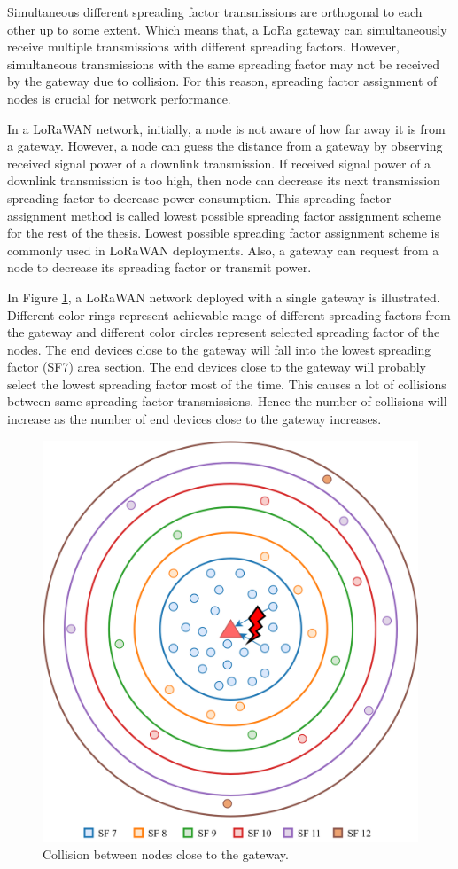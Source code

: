 Simultaneous different spreading factor transmissions are orthogonal to each other up to some extent. Which means that, a LoRa gateway can simultaneously receive multiple transmissions with different spreading factors. However, simultaneous transmissions with the same spreading factor may not be received by the gateway due to collision. For this reason, spreading factor assignment of nodes is crucial for network performance.

In a LoRaWAN network, initially, a node is not aware of how far away it is from a gateway. However, a node can guess the distance from a gateway by observing received signal power of a downlink transmission. If received signal power of a downlink transmission is too high, then node can decrease its next transmission spreading factor to decrease power consumption. This spreading factor assignment method is called lowest possible spreading factor assignment scheme for the rest of the thesis. Lowest possible spreading factor assignment scheme is commonly used in LoRaWAN deployments. Also, a gateway can request from a node to decrease its spreading factor or transmit power.

In Figure \ref{fig:collision}, a LoRaWAN network deployed with a single gateway is illustrated. Different color rings represent achievable range of different spreading factors from the gateway and different color circles represent selected spreading factor of the nodes. The end devices close to the gateway will fall into the lowest spreading factor (SF7) area section. The end devices close to the gateway will probably select the lowest spreading factor most of the time. This causes a lot of collisions between same spreading factor transmissions. Hence the number of collisions will increase as the number of end devices close to the gateway increases.

\begin{figure}
\centering
\includegraphics[width=.7\linewidth]{fig/lora_single_gw_collision.png}
\vspace*{5mm}
\caption{Collision between nodes close to the gateway.}
\label{fig:collision}
\end{figure}

